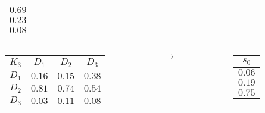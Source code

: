 \documentclass{beamer}
\begin{document}
\begin{frame}
\begin{columns}
\begin{column}{0.1\textwidth}
\begin{table}
\begin{tabular}{c}
				$0.69$\\
				$0.23$\\
				$0.08$
				\end{tabular}
			\end{table}
		\end{column}
	\end{columns}
	\begin{columns}
		\begin{column}{0.4\textwidth}
			\begin{table}
				\begin{tabular}{c|c|c|c}
				$K_3$	&	$D_1$	&	$D_2$	&	$D_3$\\ \hline
				$D_1$	&	$0.16$	&	$0.15$	&	$0.38$\\ \hline
				$D_2$	&	$0.81$	&	$0.74$	&	$0.54$\\ \hline
				$D_3$	&	$0.03$	&	$0.11$	&	$0.08$
				\end{tabular}
			\end{table}
		\end{column}
		\begin{column}{0.1\textwidth}
			$\rightarrow$
		\end{column}
		\begin{column}{0.1\textwidth}
			\begin{table}
				\begin{tabular}{c}
				$s_0$\\ \hline
				$0.06$\\
				$0.19$\\
				$0.75$
				\end{tabular}
			\end{table}
		\end{column}
	\end{columns}
\end{frame}
\end{document}
